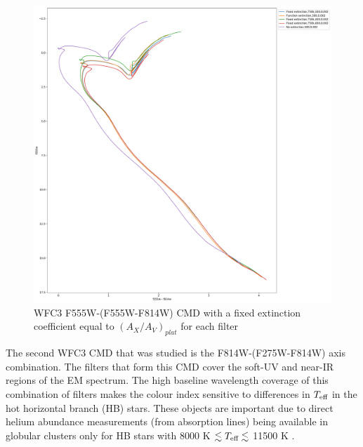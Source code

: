 \documentclass[12pt, a4paper]{report}
\begin{document}
\begin{figure}[h]
\begin{center}
\includegraphics[scale=0.25]{../basti_isochrones_10_13Gyr/Extinction_T50k_FeH0fix_func_f555w_f555wmf814w_500_400_600_Myr_FeH_0p002_ref_noext_Av_1p0.pdf}
\caption{WFC3 F555W-(F555W-F814W) CMD with a fixed extinction coefficient equal to $(A_{X}/A_{V})_{plat}$ for each filter}
\label{wfc3_isoc1_T50k}
\end{center}
\end{figure}

The second WFC3 CMD that was studied is the F814W-(F275W-F814W) axis combination. The filters that form this CMD cover the soft-UV and near-IR regions of the EM spectrum. The high baseline wavelength coverage of this combination of filters makes the colour index sensitive to differences in $T_{\textnormal{eff}}$ in the hot horizontal branch (HB) stars. These objects are important due to direct helium abundance measurements (from absorption lines) being available in globular clusters only for HB stars with 8000 K $\lesssim T_{\textnormal{eff}} \lesssim$ 11500 K \citep{2018MNRAS.475.4088L}.
\end{document}

